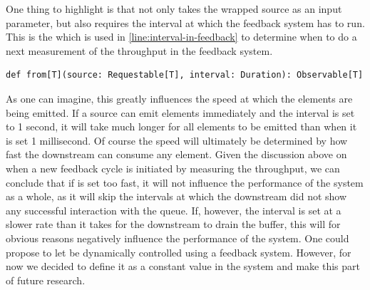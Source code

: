 One thing to highlight is that  not only takes the wrapped source as an input parameter, but also requires the interval at which the feedback system has to run. This is the  which is used in  \cref{line:interval-in-feedback} to determine when to do a next measurement of the throughput in the feedback system.

\begin{lstlisting}[style=InlineScalaStyle]
def from[T](source: Requestable[T], interval: Duration): Observable[T]
\end{lstlisting}

As one can imagine, this greatly influences the speed at which the elements are being emitted. If a source can emit elements immediately and the interval is set to 1 second, it will take much longer for all elements to be emitted than when it is set 1 millisecond. Of course the speed will ultimately be determined by how fast the downstream can consume any element. Given the discussion above on when a new feedback cycle is initiated by measuring the throughput, we can conclude that if  is set too fast, it will not influence the performance of the system as a whole, as it will skip the intervals at which the downstream did not show any successful interaction with the queue. If, however, the interval is set at a slower rate than it takes for the downstream to drain the buffer, this will for obvious reasons negatively influence the performance of the system. One could propose to let  be dynamically controlled using a feedback system. However, for now we decided to define it as a constant value in the system and make this part of future research.
